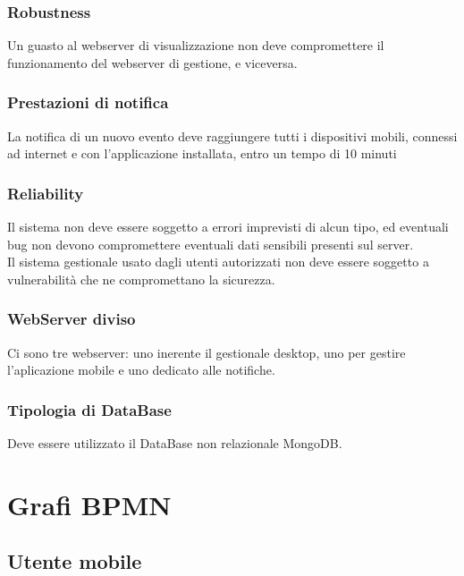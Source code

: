 \documentclass{article}
\begin{document}
\subsubsection{Robustness}
Un guasto al webserver di visualizzazione non deve compromettere il funzionamento del webserver di gestione, e viceversa.

\subsubsection{Prestazioni di notifica}
La notifica di un nuovo evento deve raggiungere tutti i dispositivi mobili, connessi ad internet e con l'applicazione installata, entro un tempo di 10 minuti

\subsubsection{Reliability}
Il sistema non deve essere soggetto a errori imprevisti di alcun tipo, ed eventuali bug non devono compromettere eventuali dati sensibili presenti sul server.\\
Il sistema gestionale usato dagli utenti autorizzati non deve essere soggetto a vulnerabilità che ne compromettano la sicurezza. 

\subsubsection{WebServer diviso}
Ci sono tre webserver: uno inerente il gestionale desktop, uno per gestire l'aplicazione mobile e uno dedicato alle notifiche.

\subsubsection{Tipologia di DataBase}
Deve essere utilizzato il DataBase non relazionale MongoDB.

\clearpage

\section{Grafi BPMN}

\subsection{Utente mobile}
\end{document}
